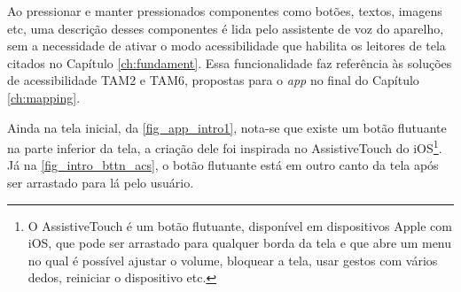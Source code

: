 Ao pressionar e manter pressionados componentes como botões, textos, imagens etc, uma descrição desses
componentes é lida pelo assistente de voz do aparelho, sem a necessidade de ativar o modo acessibilidade
que habilita os leitores de tela citados no Capítulo \ref{ch:fundament}. Essa funcionalidade faz referência
às soluções de acessibilidade TAM2 e TAM6, propostas para o \emph{app} no final do Capítulo \ref{ch:mapping}.

Ainda na tela inicial, da \autoref{fig_app_intro1}, nota-se que existe um botão flutuante na parte inferior
da tela, a criação dele foi inspirada no AssistiveTouch do iOS\footnote{O AssistiveTouch é um botão flutuante,
    disponível em dispositivos Apple com iOS, que pode ser arrastado para qualquer borda da tela e que abre
    um menu no qual é possível ajustar o volume, bloquear a tela, usar gestos com vários dedos, reiniciar o
    dispositivo etc.}. Já na \autoref{fig_intro_bttn_acs}, o botão flutuante
está em outro canto da tela após ser arrastado para lá pelo usuário.

